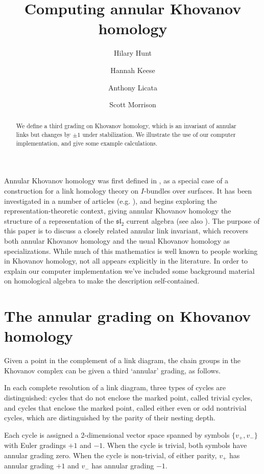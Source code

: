 \documentclass{amsart}
\title{Computing annular Khovanov homology}
\author{Hilary Hunt}
\author{Hannah Keese}
\author{Anthony Licata}
\author{Scott Morrison}
\theoremstyle{plain}
\begin{document}
\begin{abstract}
We define a third grading on Khovanov homology, which is an invariant of annular links but changes by $\pm 1$ under stabilization. We illustrate the use of our computer implementation, and give some example calculations.
\end{abstract}

\maketitle


Annular Khovanov homology was first defined in \cite{MR2113902}, as a special case of a construction for a link homology theory on $I$-bundles over surfaces. It has been investigated in a number of articles (e.g. \cite{MR2728482, MR3147412, MR2866927, 1212.2222, 1303.1986, 1305.2183}), and \cite{GLW} begins exploring the representation-theoretic context, giving annular Khovanov homology the structure of a representation of the $\mathfrak{sl}_2$ current algebra (see also \cite{KeeseThesis, QR}). The purpose of this paper is to discuss a closely related annular link invariant, which recovers both annular Khovanov homology and the usual Khovanov homology as specializations.  While much of this mathematics is well known to people working in Khovanov homology, not all appears explicitly in the literature.
In order to explain our computer implementation we've included some background material on homological algebra to make the description self-contained.


\section{The annular grading on Khovanov homology}
Given a point in the complement of a link diagram, the chain groups in the Khovanov complex can be given a third `annular' grading, as follows.

In each complete resolution of a link diagram, three types of cycles are distinguished: cycles that do not enclose the marked point, called trivial cycles, and cycles that enclose the marked point, called either even or odd nontrivial cycles, which are distinguished by the parity of their nesting depth.

Each cycle is assigned a 2-dimensional vector space spanned by symbols $\{v_+, v_-\}$ with Euler gradings $+1$ and $-1$. When the cycle is trivial, both symbols have annular grading zero. When the cycle is non-trivial, of either parity, $v_+$ has annular grading $+1$ and $v_-$ has annular grading $-1$.
\end{document}

